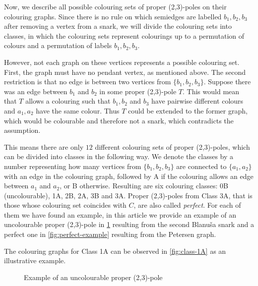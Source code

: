\label{sec:colouring-classes}

Now, we describe all possible colouring sets of proper (2,3)-poles on their colouring graphs. Since there is no rule on which semiedges are labelled $b_1,b_2,b_3$ after removing a vertex from a snark, we will divide the colouring sets into classes, in which the colouring sets represent colourings up to a permutation of colours and a permutation of labels $b_1,b_2,b_3$.

However, not each graph on these vertices represents a possible colouring set. First, the graph must have no pendant vertex, as mentioned above. The second restriction is that no edge is between two vertices from $\{b_1,b_2,b_3\}$. Suppose there was an edge between $b_1$ and $b_2$ in some proper (2,3)-pole $T$. This would mean that $T$ allows a colouring such that $b_1,b_2$ and $b_3$ have pairwise different colours and $a_1,a_2$ have the same colour. Thus $T$ could be extended to the former graph, which would be colourable and therefore not a snark, which contradicts the assumption.

This means there are only $12$ different colouring sets of proper (2,3)-poles, which can be divided into classes in the following way. We denote the classes by a number representing how many vertices from $\{b_1,b_2,b_3\}$ are connected to $\{a_1,a_2\}$ with an edge in the colouring graph, followed by A if the colouring allows an edge between $a_1$ and $a_2$, or B otherwise. Resulting are six colouring classes: 0B (uncolourable), 1A, 2B, 2A, 3B and 3A. Proper (2,3)-poles from Class 3A, that is those whose colouring set coincides with $C$, are also called \textit{perfect}. For each of them we have found an example, in this article we provide an example of an uncolourable proper (2,3)-pole in \cref{fig:uncolourable-example} resulting from the second Blanuša snark and a perfect one in \cref{fig:perfect-example} resulting from the Petersen graph.

The colouring graphs for Class 1A can be observed in \cref{fig:class-1A} as an illustrative example.

\begin{figure}
	\centering
	\scalebox{0.7}{
		
	}
	\caption{Example of an uncolourable proper (2,3)-pole}
	\label{fig:uncolourable-example}
\end{figure}

